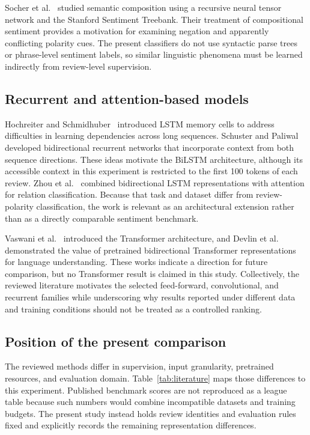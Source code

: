 Socher et al.~\cite{socher2013} studied semantic composition using a recursive neural tensor network and the Stanford Sentiment Treebank. Their treatment of compositional sentiment provides a motivation for examining negation and apparently conflicting polarity cues. The present classifiers do not use syntactic parse trees or phrase-level sentiment labels, so similar linguistic phenomena must be learned indirectly from review-level supervision.

\subsection{Recurrent and attention-based models}
Hochreiter and Schmidhuber~\cite{hochreiter1997} introduced LSTM memory cells to address difficulties in learning dependencies across long sequences. Schuster and Paliwal~\cite{schuster1997} developed bidirectional recurrent networks that incorporate context from both sequence directions. These ideas motivate the BiLSTM architecture, although its accessible context in this experiment is restricted to the first 100 tokens of each review. Zhou et al.~\cite{zhou2016} combined bidirectional LSTM representations with attention for relation classification. Because that task and dataset differ from review-polarity classification, the work is relevant as an architectural extension rather than as a directly comparable sentiment benchmark.

Vaswani et al.~\cite{vaswani2017} introduced the Transformer architecture, and Devlin et al.~\cite{devlin2019} demonstrated the value of pretrained bidirectional Transformer representations for language understanding. These works indicate a direction for future comparison, but no Transformer result is claimed in this study. Collectively, the reviewed literature motivates the selected feed-forward, convolutional, and recurrent families while underscoring why results reported under different data and training conditions should not be treated as a controlled ranking.


\subsection{Position of the present comparison}
The reviewed methods differ in supervision, input granularity, pretrained resources, and evaluation domain. Table~\ref{tab:literature} maps those differences to this experiment. Published benchmark scores are not reproduced as a league table because such numbers would combine incompatible datasets and training budgets. The present study instead holds review identities and evaluation rules fixed and explicitly records the remaining representation differences.

